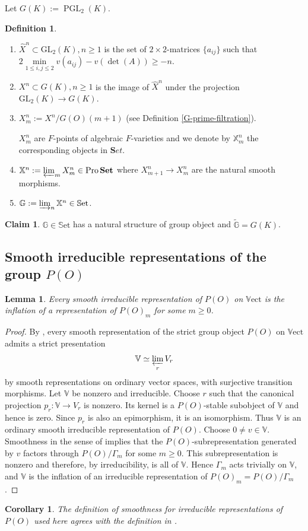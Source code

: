 \documentclass[11pt,a4paper,twoside]{amsart}
\newtheorem{lemma}[theorem]{Lemma}
\newtheorem{corollary}[theorem]{Corollary}
\theoremstyle{definition}
\newtheorem{definition}[theorem]{Definition}
\newtheorem{claim}[theorem]{Claim}
\theoremstyle{remark}
\newcommand{\mG}{\mathbb G}
\newcommand{\mV}{\mathbb V}
\newcommand{\mX}{\mathbb X}
\newcommand{\GG}{\Gamma}
\newcommand{\wt}{\widetilde}
\newcommand{\prl}{\varprojlim}
\newcommand{\inl}{\varinjlim}
\newcommand{\sms}{\smallskip}
\newcommand{\PGL}{\operatorname{PGL}}
\newcommand{\Pro}{\operatorname{Pro}}
\newcommand{\mSet}{\mathbb{S}\mathrm{et}}
\newcommand{\mVect}{\mathbb{V}\mathrm{ect}}
\begin{document}
Let $ G(K):=  {\PGL}_2(K)$.  \begin{definition}\label{G}
\begin{enumerate}
\item $ \hat  X ^n\subset \text{GL}_2(K),n\geq 1$ is  the set of $2\times 2$-matrices $\{a_{ij}\}$
such that
 $2 \min \limits_{1\leq i,j \leq 2}v(a_{ij})- v(\det (A))\geq -n$.
\item $  X ^n\subset G(K),n\geq 1$ is the image of $  \hat  X^n$ under the projection $ \text{GL}_2(K) \to  G(K)$.

\item $ X ^n  _m:=  X^n /  G(O)(m+1) $ (see Definition \ref{G-prime-filtration}).

\sms

  $X ^n _m$ are
$F$-points of algebraic $F$-varieties and we  denote by  $ \mX ^n _m $ the corresponding objects in $  \textbf{S} et$.
\item
$\mX ^n := \prl _m X^n_m \in \Pro \textbf{Set}$ where $ X ^n _{m+1} \to X ^n _m $ are the natural  smooth morphisms.
\item
 $\mG:= \inl _n \mX ^n\in \mSet$.
\end{enumerate}
\end{definition}
\begin{claim} $ \mG \in \mSet $ has a natural structure of group object and $\wt {\mG}=G(K)$.
\end{claim}

\subsection{Smooth irreducible representations of the group $P(O)$}

\begin{lemma}\label{inf}
Every smooth irreducible representation of $P(O)$ on $\mVect$ is the inflation of a representation of $P(O)_m$ for some $m\geq0$.
\end{lemma}
\begin{proof}
By \cite[Proposition~2.5]{GK}, every smooth representation of the strict group object $P(O)$ on $\mVect$ admits a strict presentation
$$
\mV\simeq\varprojlim_r V_r
$$
by smooth representations on ordinary vector spaces, with surjective transition morphisms. Let $\mV$ be nonzero and irreducible. Choose $r$ such that the canonical projection $p_r:\mV\to V_r$ is nonzero. Its kernel is a $P(O)$-stable subobject of $\mV$ and hence is zero. Since $p_r$ is also an epimorphism, it is an isomorphism. Thus $\mV$ is an ordinary smooth irreducible representation of $P(O)$.
Choose $0\neq v\in\mV$. Smoothness in the sense of \cite[Subsection~2.4]{GK} implies that the $P(O)$-subrepresentation generated by $v$ factors through $P(O)/\GG_m$ for some $m\geq0$. This subrepresentation is nonzero and therefore, by irreducibility, is all of $\mV$. Hence $\GG_m$ acts trivially on $\mV$, and $\mV$ is the inflation of an irreducible representation of $P(O)_m=P(O)/\GG_m$.
\end{proof}
\begin{corollary}
The definition of smoothness for irreducible representations of $P(O)$ used here agrees with the definition in \cite[Subsection~2.4]{GK}.
\end{corollary}
\end{document}
